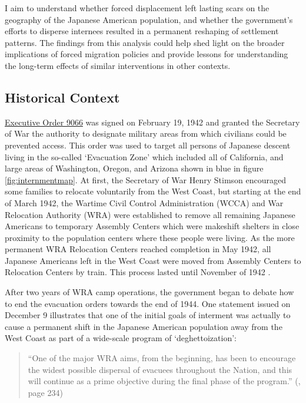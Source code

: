 \documentclass[12pt]{article}
\begin{document}
I aim to understand whether forced displacement left lasting scars on the geography of the Japanese American population,
and whether the government’s efforts to disperse internees resulted in a permanent reshaping of settlement patterns.
The findings from this analysis could help shed light on the broader implications of forced migration policies 
and provide lessons for understanding the long-term effects of similar interventions in other contexts.

\subsection{Historical Context}\label{history}

\href{https://www.archives.gov/milestone-documents/executive-order-9066}{Executive Order 9066} 
was signed on February 19, 1942 and granted the Secretary of War the authority
to designate military areas from which civilians could be prevented access. This
order was used to target all persons of Japanese descent living in the so-called
`Evacuation Zone' which included all of California, and large areas of
Washington, Oregon, and Arizona shown in blue in figure \ref{fig:internmentmap}.
At first, the Secretary of War Henry Stimson encouraged some families to relocate voluntarily from the West Coast, but starting at the end of March 1942, the
Wartime Civil Control Administration (WCCA) and War Relocation Authority (WRA)
were established to remove all remaining Japanese Americans to temporary
Assembly Centers which were makeshift shelters in close proximity to the
population centers where these people were living. As the more permanent WRA
Relocation Centers reached completion in May 1942, all Japanese Americans left
in the West Coast were moved from Assembly Centers to Relocation Centers by
train. This process lasted until November of 1942
\citep{commission_on_wartime_relocation_personal_1983}.

After two years of WRA camp operations, the government began to debate how to
end the evacuation orders towards the end of 1944. One statement issued on
December 9 illustrates that one of the initial goals of interment was actually
to cause a permanent shift in the Japanese American population away from the
West Coast as part of a wide-scale program of `deghettoization':
\begin{quote}
  ``One of the major WRA aims, from the beginning, has been to encourage the widest possible dispersal of evacuees throughout the Nation, and this will continue as a prime objective during the final phase of the program.''
  (\cite{commission_on_wartime_relocation_personal_1983}, page 234)
\end{quote}
\end{document}
